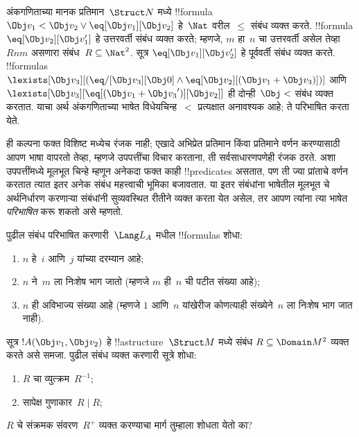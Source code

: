 \documentclass[../../../include/open-logic-section]{subfiles}
\begin{document}
\begin{ex}
अंकगणिताच्या मानक प्रतिमान~$\Struct N$ मध्ये !!{formula} $\Obj
v_1 < \Obj v_2 \lor \eq[\Obj v_1][\Obj v_2]$ हे~$\Nat$ वरील~$\le$
संबंध व्यक्त करते. !!{formula} $\eq[\Obj v_2][\Obj v_1']$ हे उत्तरवर्ती
संबंध व्यक्त करते; म्हणजे, $m$ हा~$n$ चा उत्तरवर्ती असेल तेव्हा
$Rnm$ असणारा संबंध~$R \subseteq \Nat^2$. सूत्र
$\eq[\Obj v_1][\Obj v_2']$ हे पूर्ववर्ती संबंध व्यक्त करते. !!{formula}s
$\lexists[\Obj v_3][(\eq/[\Obj v_3][\Obj 0] \land
  \eq[\Obj v_2][(\Obj v_1 + \Obj v_3)])]$ आणि $\lexists[\Obj
  v_3][\eq[(\Obj v_1 + {\Obj v_3}')][\Obj v_2]]$ ही दोन्ही~$\Obj <$
संबंध व्यक्त करतात.
याचा अर्थ अंकगणिताच्या भाषेत विधेयचिन्ह~$<$ प्रत्यक्षात अनावश्यक आहे; ते
परिभाषित करता येते.
\end{ex}

\begin{explain}
ही कल्पना फक्त विशिष्ट मध्येच रंजक नाही; एखादे अभिप्रेत
प्रतिमान किंवा प्रतिमाने वर्णन करण्यासाठी आपण भाषा वापरतो तेव्हा, म्हणजे
उपपत्तींचा विचार करताना, ती सर्वसाधारणपणेही रंजक ठरते. अशा उपपत्तींमध्ये
मूलभूत चिन्हे म्हणून अनेकदा फक्त काही !!{predicate}s असतात, पण ती ज्या
प्रांताचे वर्णन करतात त्यात इतर अनेक संबंध महत्त्वाची भूमिका बजावतात. या
इतर संबंधांना भाषेतील मूलभूत चे अर्थनिर्धारण करणाऱ्या
संबंधांनी सुव्यवस्थित रीतीने व्यक्त करता येत असेल, तर आपण त्यांना त्या
भाषेत \emph{परिभाषित} करू शकतो असे म्हणतो.
\end{explain}

\begin{prob}
पुढील संबंध परिभाषित करणारी~$\Lang L_A$ मधील !!{formula}s शोधा:
\begin{enumerate}
\item $n$ हे~$i$ आणि~$j$ यांच्या दरम्यान आहे;
\item $n$ ने~$m$ ला निःशेष भाग जातो (म्हणजे $m$ ही~$n$ ची पटीत संख्या आहे);
\item $n$ ही अविभाज्य संख्या आहे (म्हणजे $1$ आणि~$n$ यांखेरीज कोणत्याही
  संख्येने~$n$ ला निःशेष भाग जात नाही).
\end{enumerate}
\end{prob}

\begin{prob}
सूत्र $!A(\Obj v_1, \Obj v_2)$ हे !!a{structure}~$\Struct M$ मध्ये संबंध
$R \subseteq \Domain M^2$ व्यक्त करते असे समजा. पुढील संबंध व्यक्त करणारी
सूत्रे शोधा:
\begin{enumerate}
\item $R$ चा व्युत्क्रम~$R^{-1}$;
\item सापेक्ष गुणाकार~$R \mid R$;
\end{enumerate}
$R$ चे संक्रमक संवरण~$R^+$ व्यक्त करण्याचा मार्ग तुम्हाला शोधता येतो का?
\end{prob}
\end{document}
